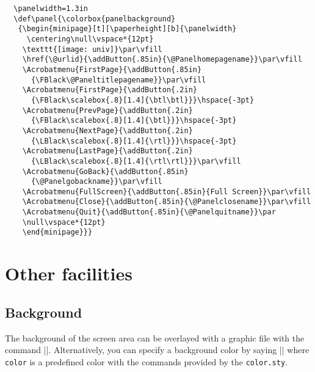 \documentclass[a4paper]{article}
\begin{document}
\begin{verbatim}
  \panelwidth=1.3in
  \def\panel{\colorbox{panelbackground}
   {\begin{minipage}[t][\paperheight][b]{\panelwidth}
     \centering\null\vspace*{12pt}
    \texttt{[image: univ]}\par\vfill
    \href{\@urlid}{\addButton{.85in}{\@Panelhomepagename}}\par\vfill
    \Acrobatmenu{FirstPage}{\addButton{.85in}
      {\FBlack\@Paneltitlepagename}}\par\vfill
    \Acrobatmenu{FirstPage}{\addButton{.2in}
      {\FBlack\scalebox{.8}[1.4]{\btl\btl}}}\hspace{-3pt}
    \Acrobatmenu{PrevPage}{\addButton{.2in}
      {\FBlack\scalebox{.8}[1.4]{\btl}}}\hspace{-3pt}
    \Acrobatmenu{NextPage}{\addButton{.2in}
      {\LBlack\scalebox{.8}[1.4]{\rtl}}}\hspace{-3pt}
    \Acrobatmenu{LastPage}{\addButton{.2in}
      {\LBlack\scalebox{.8}[1.4]{\rtl\rtl}}}\par\vfill
    \Acrobatmenu{GoBack}{\addButton{.85in}
      {\@Panelgobackname}}\par\vfill
    \Acrobatmenu{FullScreen}{\addButton{.85in}{Full Screen}}\par\vfill
    \Acrobatmenu{Close}{\addButton{.85in}{\@Panelclosename}}\par\vfill
    \Acrobatmenu{Quit}{\addButton{.85in}{\@Panelquitname}}\par
    \null\vspace*{12pt}
    \end{minipage}}}
\end{verbatim}

\section{Other facilities}
\subsection{Background}

The background of the screen area can be overlayed with a graphic file
with the command |\overlay|. Alternatively, you
can specify a background color by saying |\backgroundcolor|
where \verb+color+ is a predefined color with the commands provided by
the \verb+color.sty+.
\end{document}
